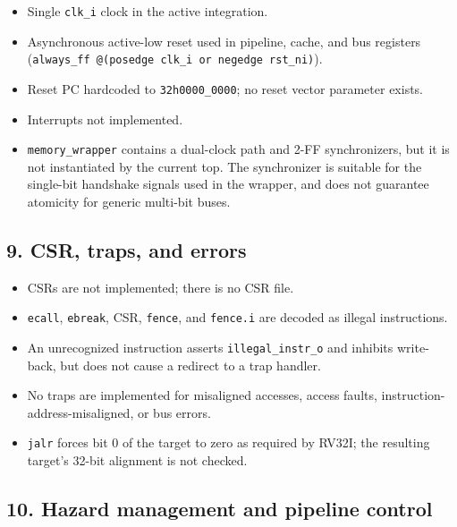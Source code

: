 \documentclass[]{article}
\providecommand{\tightlist}{%
  \setlength{\itemsep}{0pt}\setlength{\parskip}{0pt}}
\begin{document}
\begin{itemize}
\tightlist
\item
  Single \texttt{clk\_i} clock in the active integration.
\item
  Asynchronous active-low reset used in pipeline, cache, and bus
  registers
  (\texttt{always\_ff\ @(posedge\ clk\_i\ or\ negedge\ rst\_ni)}).
\item
  Reset PC hardcoded to \texttt{32\textquotesingle{}h0000\_0000}; no
  reset vector parameter exists.
\item
  Interrupts not implemented.
\item
  \texttt{memory\_wrapper} contains a dual-clock path and 2-FF
  synchronizers, but it is not instantiated by the current top. The
  synchronizer is suitable for the single-bit handshake signals used in
  the wrapper, and does not guarantee atomicity for generic multi-bit
  buses.
\end{itemize}

\hypertarget{9-csr-traps-and-errors}{%
\subsection{9. CSR, traps, and errors}\label{9-csr-traps-and-errors}}

\begin{itemize}
\tightlist
\item
  CSRs are not implemented; there is no CSR file.
\item
  \texttt{ecall}, \texttt{ebreak}, CSR, \texttt{fence}, and
  \texttt{fence.i} are decoded as illegal instructions.
\item
  An unrecognized instruction asserts \texttt{illegal\_instr\_o} and
  inhibits write-back, but does not cause a redirect to a trap handler.
\item
  No traps are implemented for misaligned accesses, access faults,
  instruction-address-misaligned, or bus errors.
\item
  \texttt{jalr} forces bit 0 of the target to zero as required by RV32I;
  the resulting target's 32-bit alignment is not checked.
\end{itemize}

\hypertarget{10-hazard-management-and-pipeline-control}{%
\subsection{10. Hazard management and pipeline
control}\label{10-hazard-management-and-pipeline-control}}
\end{document}
